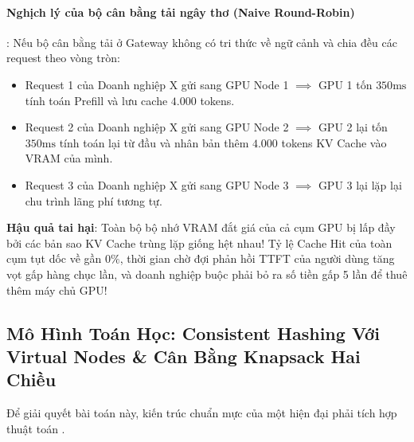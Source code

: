 \paragraph{Nghịch lý của bộ cân bằng tải ngây thơ (Naive Round-Robin)}:
Nếu bộ cân bằng tải ở Gateway không có tri thức về ngữ cảnh và chia đều các request theo vòng tròn:
\begin{itemize}
  \item Request 1 của Doanh nghiệp X gửi sang GPU Node 1 $\implies$ GPU 1 tốn $350\text{ms}$ tính toán Prefill và lưu cache $4.000$ tokens.
  \item Request 2 của Doanh nghiệp X gửi sang GPU Node 2 $\implies$ GPU 2 lại tốn $350\text{ms}$ tính toán lại từ đầu và nhân bản thêm $4.000$ tokens KV Cache vào VRAM của mình.
  \item Request 3 của Doanh nghiệp X gửi sang GPU Node 3 $\implies$ GPU 3 lại lặp lại chu trình lãng phí tương tự.
\end{itemize}
\textbf{Hậu quả tai hại}: Toàn bộ bộ nhớ VRAM đắt giá của cả cụm GPU bị lấp đầy bởi các bản sao KV Cache trùng lặp giống hệt nhau! Tỷ lệ Cache Hit của toàn cụm tụt dốc về gần $0\%$, thời gian chờ đợi phản hồi TTFT của người dùng tăng vọt gấp hàng chục lần, và doanh nghiệp buộc phải bỏ ra số tiền gấp 5 lần để thuê thêm máy chủ GPU!

\subsection{Mô Hình Toán Học: Consistent Hashing Với Virtual Nodes \& Cân Bằng Knapsack Hai Chiều}
Để giải quyết bài toán này, kiến trúc chuẩn mực của một  hiện đại phải tích hợp thuật toán .

